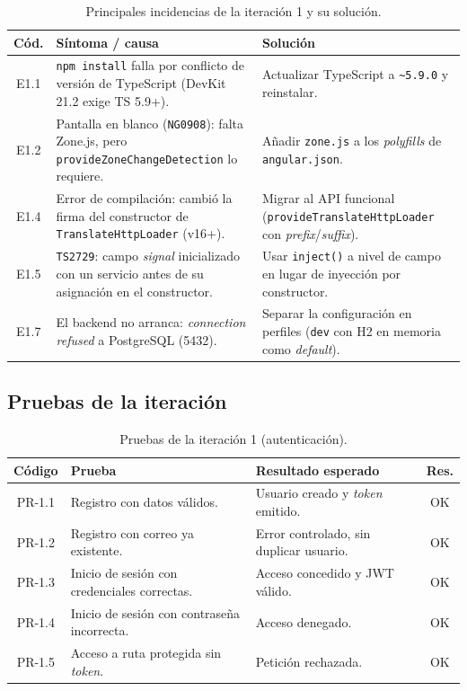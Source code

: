 \begin{table}[h!]
\centering
\small
\begin{tabular}{|c|p{5cm}|p{7cm}|}
\hline
\textbf{Cód.} & \textbf{Síntoma / causa} & \textbf{Solución} \\ \hline
E1.1 & \texttt{npm install} falla por conflicto de versión de TypeScript (DevKit 21.2 exige TS 5.9+). & Actualizar TypeScript a \texttt{\textasciitilde 5.9.0} y reinstalar. \\ \hline
E1.2 & Pantalla en blanco (\texttt{NG0908}): falta Zone.js, pero \texttt{provideZoneChangeDetection} lo requiere. & Añadir \texttt{zone.js} a los \textit{polyfills} de \texttt{angular.json}. \\ \hline
E1.4 & Error de compilación: cambió la firma del constructor de \texttt{TranslateHttpLoader} (v16+). & Migrar al API funcional (\texttt{provideTranslateHttpLoader} con \textit{prefix}/\textit{suffix}). \\ \hline
E1.5 & \texttt{TS2729}: campo \textit{signal} inicializado con un servicio antes de su asignación en el constructor. & Usar \texttt{inject()} a nivel de campo en lugar de inyección por constructor. \\ \hline
E1.7 & El backend no arranca: \textit{connection refused} a PostgreSQL (5432). & Separar la configuración en perfiles (\texttt{dev} con H2 en memoria como \textit{default}). \\ \hline
\end{tabular}
\caption{Principales incidencias de la iteración 1 y su solución.}
\label{tab:inc-it1}
\end{table}

\subsection{Pruebas de la iteración}

\begin{table}[h!]
\centering
\small
\begin{tabular}{|c|p{6.5cm}|p{5cm}|c|}
\hline
\textbf{Código} & \textbf{Prueba} & \textbf{Resultado esperado} & \textbf{Res.} \\ \hline
PR-1.1 & Registro con datos válidos. & Usuario creado y \textit{token} emitido. & OK \\ \hline
PR-1.2 & Registro con correo ya existente. & Error controlado, sin duplicar usuario. & OK \\ \hline
PR-1.3 & Inicio de sesión con credenciales correctas. & Acceso concedido y JWT válido. & OK \\ \hline
PR-1.4 & Inicio de sesión con contraseña incorrecta. & Acceso denegado. & OK \\ \hline
PR-1.5 & Acceso a ruta protegida sin \textit{token}. & Petición rechazada. & OK \\ \hline
\end{tabular}
\caption{Pruebas de la iteración 1 (autenticación).}
\label{tab:pruebas-it1}
\end{table}


